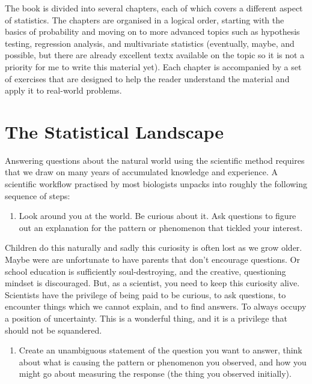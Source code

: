 \documentclass[
  letterpaper,
]{book}
\providecommand{\tightlist}{%
  \setlength{\itemsep}{0pt}\setlength{\parskip}{0pt}}\usepackage{longtable,booktabs,array}
\begin{document}
The book is divided into several chapters, each of which covers a
different aspect of statistics. The chapters are organised in a logical
order, starting with the basics of probability and moving on to more
advanced topics such as hypothesis testing, regression analysis, and
multivariate statistics (eventually, maybe, and possible, but there are
already excellent textx available on the topic so it is not a priority
for me to write this material yet). Each chapter is accompanied by a set
of exercises that are designed to help the reader understand the
material and apply it to real-world problems.


\chapter{The Statistical Landscape}\label{the-statistical-landscape}

Answering questions about the natural world using the scientific method
requires that we draw on many years of accumulated knowledge and
experience.
A scientific workflow practised by most biologists unpacks into roughly
the following sequence of steps:

\begin{enumerate}
\def\labelenumi{\arabic{enumi}.}
\tightlist
\item
  Look around you at the world. Be curious about it. Ask questions to
  figure out an explanation for the pattern or phenomenon that tickled
  your interest.
\end{enumerate}

Children do this naturally and sadly this curiosity is often lost as we
grow older. Maybe were are unfortunate to have parents that don't
encourage questions. Or school education is sufficiently
soul-destroying, and the creative, questioning mindset is discouraged.
But, as a scientist, you need to keep this curiosity alive. Scientists
have the privilege of being paid to be curious, to ask questions, to
encounter things which we cannot explain, and to find answers. To always
occupy a position of uncertainty. This is a wonderful thing, and it is a
privilege that should not be squandered.

\begin{enumerate}
\def\labelenumi{\arabic{enumi}.}
\setcounter{enumi}{1}
\tightlist
\item
  Create an unambiguous statement of the question you want to answer,
  think about what is causing the pattern or phenomenon you observed,
  and how you might go about measuring the response (the thing you
  observed initially).
\end{enumerate}
\end{document}
